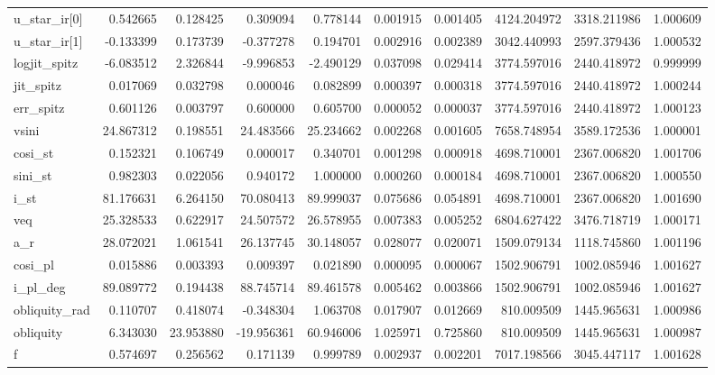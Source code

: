 \begin{tabular}{lrrrrrrrrr}
u\_star\_ir[0]  &   0.542665 &   0.128425 &   0.309094 &    0.778144 &   0.001915 &  0.001405 &  4124.204972 &  3318.211986 &  1.000609 \\
u\_star\_ir[1]  &  -0.133399 &   0.173739 &  -0.377278 &    0.194701 &   0.002916 &  0.002389 &  3042.440993 &  2597.379436 &  1.000532 \\
logjit\_spitz  &  -6.083512 &   2.326844 &  -9.996853 &   -2.490129 &   0.037098 &  0.029414 &  3774.597016 &  2440.418972 &  0.999999 \\
jit\_spitz     &   0.017069 &   0.032798 &   0.000046 &    0.082899 &   0.000397 &  0.000318 &  3774.597016 &  2440.418972 &  1.000244 \\
err\_spitz     &   0.601126 &   0.003797 &   0.600000 &    0.605700 &   0.000052 &  0.000037 &  3774.597016 &  2440.418972 &  1.000123 \\
vsini         &  24.867312 &   0.198551 &  24.483566 &   25.234662 &   0.002268 &  0.001605 &  7658.748954 &  3589.172536 &  1.000001 \\
cosi\_st       &   0.152321 &   0.106749 &   0.000017 &    0.340701 &   0.001298 &  0.000918 &  4698.710001 &  2367.006820 &  1.001706 \\
sini\_st       &   0.982303 &   0.022056 &   0.940172 &    1.000000 &   0.000260 &  0.000184 &  4698.710001 &  2367.006820 &  1.000550 \\
i\_st          &  81.176631 &   6.264150 &  70.080413 &   89.999037 &   0.075686 &  0.054891 &  4698.710001 &  2367.006820 &  1.001690 \\
veq           &  25.328533 &   0.622917 &  24.507572 &   26.578955 &   0.007383 &  0.005252 &  6804.627422 &  3476.718719 &  1.000171 \\
a\_r           &  28.072021 &   1.061541 &  26.137745 &   30.148057 &   0.028077 &  0.020071 &  1509.079134 &  1118.745860 &  1.001196 \\
cosi\_pl       &   0.015886 &   0.003393 &   0.009397 &    0.021890 &   0.000095 &  0.000067 &  1502.906791 &  1002.085946 &  1.001627 \\
i\_pl\_deg      &  89.089772 &   0.194438 &  88.745714 &   89.461578 &   0.005462 &  0.003866 &  1502.906791 &  1002.085946 &  1.001627 \\
obliquity\_rad &   0.110707 &   0.418074 &  -0.348304 &    1.063708 &   0.017907 &  0.012669 &   810.009509 &  1445.965631 &  1.000986 \\
obliquity     &   6.343030 &  23.953880 & -19.956361 &   60.946006 &   1.025971 &  0.725860 &   810.009509 &  1445.965631 &  1.000987 \\
f             &   0.574697 &   0.256562 &   0.171139 &    0.999789 &   0.002937 &  0.002201 &  7017.198566 &  3045.447117 &  1.001628 \\
\bottomrule
\end{tabular}
